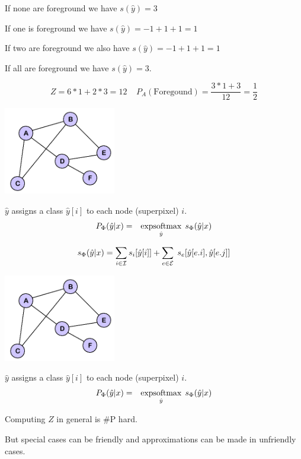 {\vfill
If none are foreground we have $s(\hat{y}) = 3$

\vfill
If one is foreground we have $s(\hat{y}) = -1 + 1+ 1 = 1$

\vfill
If two are foreground we also have $s(\hat{y}) = -1 + 1+ 1 = 1$

\vfill
If all are foreground we have $s(\hat{y}) = 3$.

\vfill
$$Z = 6*1 + 2*3 = 12\;\;\;\;P_A(\mathrm{Foregound}) = \frac{3*1 + 3}{12} = \frac{1}{2}$$

\bigskip
\centerline{\includegraphics[height= 1.5in]{../images/Graph}}
\medskip
$\hat{y} $ assigns a class $\hat{y}[i]$ to each node (superpixel) $i$.
\bigskip
\bigskip
{\color{red}
\begin{eqnarray*}
P_\Phi(\hat{y}|x) & = & \operatorname*{expsoftmax}_{\hat{y}}\;s_\Phi(\hat{y}|x)
\end{eqnarray*}
}

\vfill
{\color{red} $$s_\Phi(\hat{y}|x) = \sum_{i \in {\cal I}} s_i[\hat{y}[i]] + \sum_{e \in {\cal E}}\;s_e[\hat{y}[e.i],\hat{y}[e.j]]$$}

\bigskip
\centerline{\includegraphics[height= 1.5in]{../images/Graph}}
\medskip
$\hat{y} $ assigns a class $\hat{y}[i]$ to each node (superpixel) $i$.
\bigskip
\bigskip
{\color{red}
\begin{eqnarray*}
P_\Phi(\hat{y}|x) & = & \operatorname*{expsoftmax}_{\hat{y}}\;s_\Phi(\hat{y}|x)
\end{eqnarray*}
}

\vfill
Computing $Z$ in general is \#P hard.

\vfill
{\color{red} But special cases can be friendly and approximations can be made in unfriendly cases.}

}
